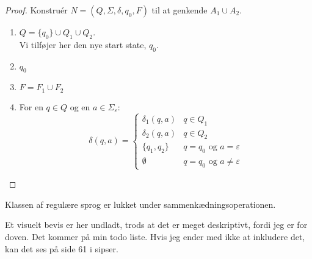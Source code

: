 \begin{proof}
Konstruér $N = (Q, \Sigma, \delta, q_{0}, F)$ til at genkende $A_1 \cup A_{2}$.
\begin{enumerate}
  \item $Q = \{q_{0}\} \cup Q_{1} \cup Q_{2}$.\\ Vi tilføjer her den nye start state, $q_{0}$.
  \item $q_{0}$
  \item $F = F_{1} \cup F_{2}$
  \item For en $q \in Q$ og en $a \in \Sigma_{\varepsilon}$:
        \begin{equation*}
\delta(q,a) = \begin{cases}
           \delta_{1}(q,a) & q \in Q_{1} \\
           \delta_{2}(q,a) & q \in Q_{2} \\
           \{q_{1}, q_{2}\} & q = q_{0} \text{ og } a = \varepsilon \\
           \emptyset & q = q_{0} \text{ og } a \neq \varepsilon
          \end{cases}
        \end{equation*}
\end{enumerate}

\end{proof}


\begin{theorem}
  \label{the:sipser1.47}
Klassen af regulære sprog er lukket under sammenkædningsoperationen.
\end{theorem}

Et visuelt bevis er her undladt, trods at det er meget deskriptivt, fordi jeg er for doven. Det kommer på min todo liste. Hvis jeg ender med ikke at inkludere det, kan det ses på side 61 i sipser.

